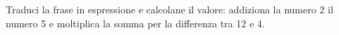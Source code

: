 \item Traduci la frase in espressione e calcolane il valore: addiziona la numero 2 il numero 5 e moltiplica la somma per la differenza tra 12 e 4.